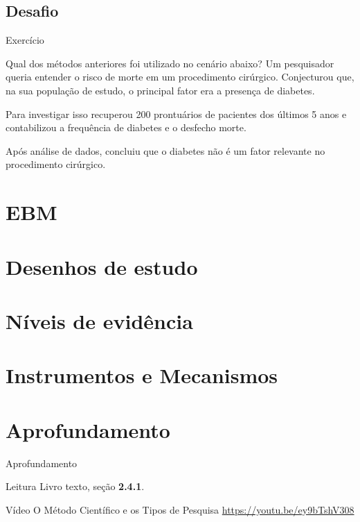 \documentclass{beamer}
\begin{document}
\subsection{Desafio}

\begin{frame}{Exercício}
  \begin{block}{Qual dos métodos anteriores foi utilizado no cenário abaixo?}
    Um pesquisador queria entender o risco de morte em um procedimento cirúrgico.
Conjecturou que, na sua população de estudo, o principal fator era a presença de diabetes.

Para investigar isso recuperou 200 prontuários de pacientes dos últimos 5 anos e contabilizou a frequência de diabetes e o desfecho morte.

Após análise de dados, concluiu que o diabetes não é um fator relevante no procedimento cirúrgico.
  \end{block}
\end{frame}

\section{EBM}

\section{Desenhos de estudo}

\section{Níveis de evidência}

\section{Instrumentos e Mecanismos}

\section{Aprofundamento}

\begin{frame}{Aprofundamento}
  \begin{block}{Leitura}
    Livro texto, seção {\bf 2.4.1}.
  \end{block}
  \begin{block}{Vídeo}
    O Método Científico e os Tipos de Pesquisa \href{https://youtu.be/ey9bTshV308}{https://youtu.be/ey9bTshV308}
  \end{block}

\end{frame}
\end{document}
